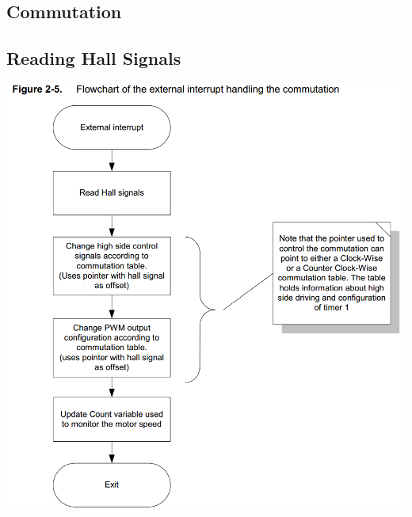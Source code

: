 \documentclass[a4paper]{article}
\begin{document}
    \subsection{Commutation}
    {\footnotesize}

\subsection{Reading Hall Signals}
    \includegraphics[width=\linewidth]{flowChart_hallInterrupt.png}

\end{document}
